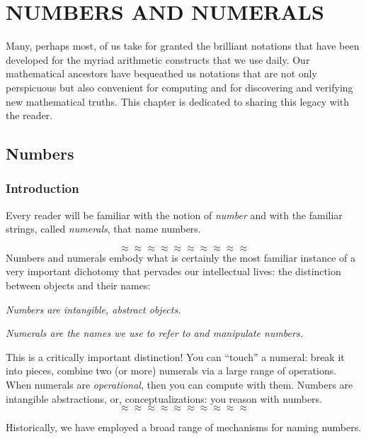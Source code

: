 
\chapter{NUMBERS AND NUMERALS}
\label{ch:numbers-numerals}

Many, perhaps most, of us take for granted the brilliant notations
that have been developed for the myriad arithmetic constructs that we
use daily.  Our mathematical ancestors have bequeathed us notations
that are not only perspicuous but also convenient for computing and
for discovering and verifying new mathematical truths.  This chapter
is dedicated to sharing this legacy with the reader.

\section{Numbers}
\label{sec:numbers}

\subsection{Introduction}

Every reader will be familiar with the notion of {\it number} and with
the familiar strings, called {\it numerals}, that name numbers.

\[ \approx \approx \approx \approx \approx \approx \approx \approx \approx \approx \]
Numbers and numerals embody what is certainly the most familiar
instance of a very important dichotomy that pervades our intellectual
lives: the distinction between objects and their names:

{\em Numbers are intangible, abstract objects.} 

{\em Numerals are the names we use to refer to and manipulate numbers.} 

\noindent
This is a critically important distinction!  You can ``touch'' a
numeral: break it into pieces, combine two (or more) numerals via a
large range of operations.  When numerals are {\em operational},
 then you can compute with them.  Numbers are
intangible abstractions, or, conceptualizations: you reason with
numbers.
\[ \approx \approx \approx \approx \approx \approx \approx \approx \approx \approx \]

\noindent
Historically, we have employed a broad range of mechanisms for naming
numbers.

